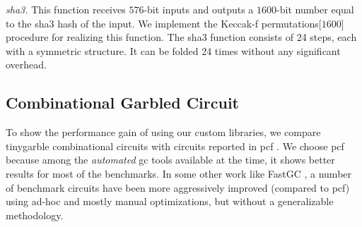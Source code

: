 \textit{\acrshort{sha}3.} This function receives $576$-bit inputs and outputs a $1600$-bit number equal to the \acrshort{sha}3 hash of the input.
We implement the Keccak-f permutations[$1600$] procedure for realizing this function.
The \acrshort{sha}3 function consists of 24 steps, each with a symmetric structure.
It can be folded 24 times without any significant overhead.

\subsection{Combinational Garbled Circuit}\label{ssec:eval-tinygarble-comb}
To show the performance gain of using our custom libraries, we compare \gls{tinygarble} combinational circuits with circuits reported in \gls{pcf} \cite{kreuter2013pcf}.
We choose \gls{pcf} because among the \emph{automated} \acrshort{gc} tools available at the time, it shows better results for most of the benchmarks.
In some other work like FastGC \cite{huang2011faster}, a number of benchmark circuits have been more aggressively improved (compared to \gls{pcf}) using ad-hoc and mostly manual optimizations, but without a generalizable methodology.

